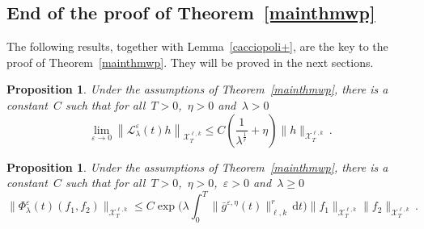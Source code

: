 \documentclass[11pt]{article}
\newtheorem{prop}[theo]{Proposition}
\theoremstyle{definition}
\numberwithin{equation}{section}
\numberwithin{figure}{section}
\numberwithin{table}{section}
\newcommand*{\dd}{\mathrm{d}}
\newcommand*{\dt}{\dd t}
\newcommand*\eps{{\varepsilon}}
\newcommand*\e{{\varepsilon}}
\begin{document}
\subsection{End of the proof of Theorem~\ref{mainthmwp}}

The following results, together with Lemma~\ref{cacciopoli+}, are the key to the proof of Theorem~\ref{mainthmwp}. They will be proved in the next sections.

\begin{prop}\label{linear}
Under the assumptions of Theorem~\ref{mainthmwp}, there is a constant~$C$ such that for all~$T>0$,~$\eta>0$ and~$\lambda>0$
\[
\lim_{\e \to 0} \left\| \mathcal{L}_\lambda^{\e}(t) h \right\|_{\mathcal{X}_T^{\ell,k}} \leq C\left(
\frac1{\lambda^\frac1r } + \eta\right)\| h \|_{\mathcal{X}_T^{\ell,k}}\,.
\]
\end{prop}

\begin{prop}\label{nonlinear}
Under the assumptions of Theorem~\ref{mainthmwp}, there is a constant~$C$ such that for all~$T>0$,~$\eta>0$,~$\e>0$ and~$\lambda\geq0$
\[
\big\| \Phi_\lambda^{\e}(t) (f_1,f_2)\big\|_{\mathcal{X}_T^{\ell,k} } \leq C
\exp \Big(\lambda \int_0^T {\|\bar g^{\eps,\eta}(t)\|_{\ell,k}^r}\, \dt \Big)
\| f_1 \|_{\mathcal{X}_T^{\ell,k}} \| f_2 \|_{\mathcal{X}_T^{\ell,k}} \,.
\]
\end{prop}
\end{document}
